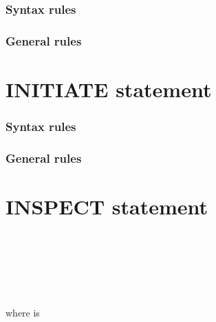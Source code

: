 \subsubsection{Syntax rules}

\subsubsection{General rules}

\section{INITIATE statement}
\begin{syntax}
\end{syntax}

\subsubsection{Syntax rules}

\subsubsection{General rules}

\section{INSPECT statement}

\begin{syntax}
  \begin{1=}
    \identifier \\
    \literal \\
    \functionname
  \end{1=}
  \begin{1=}
    \begin{0-1}
    \end{0-1} \\

     \\
  \end{1=}
\end{syntax}

where  is

